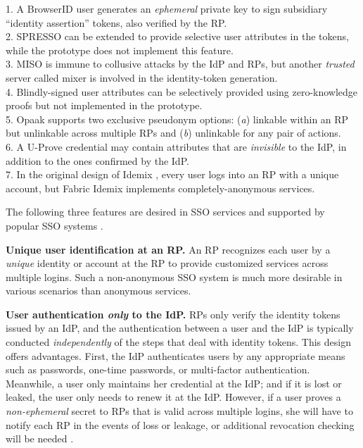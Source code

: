 \begin{table}[tb]
    \label{tbl:comparison-protocol}
\flushleft
{\footnotesize
1. A BrowserID user generates an \emph{ephemeral} private key to sign subsidiary ``identity assertion'' tokens,
also verified by the RP.\\
2. SPRESSO can be extended to provide selective user attributes in the tokens, while the prototype does not implement this feature.\\
3. MISO is immune to collusive attacks by the IdP and RPs, but another \emph{trusted} server called mixer is involved in the identity-token generation.\\
4. Blindly-signed user attributes can be selectively provided using zero-knowledge proofs but not implemented in the prototype.\\
5. Opaak supports two exclusive pseudonym options: (\emph{a}) linkable within an RP but unlinkable across multiple RPs and (\emph{b}) unlinkable for any pair of actions.\\
6. A U-Prove credential may contain attributes that are \emph{invisible} to the IdP, in addition to the ones confirmed by the IdP. \\
7. In the original design of Idemix \cite{idemix}, every user logs into an RP with a unique account, but Fabric Idemix implements completely-anonymous services.}
\end{table}

The following three features are desired in SSO services and supported by popular SSO systems \cite{NIST2017draft, OpenIDConnect,rfc6749, SAML, SAMLIdentifier}.

\noindent \textbf{Unique user identification at an RP.}
An RP recognizes each user by a \emph{unique} identity or account at the RP to provide customized services across multiple logins.
Such a non-anonymous SSO system is much more desirable in various scenarios than anonymous services.

\noindent\textbf{User authentication {\em only} to the IdP.}
RPs only verify the identity tokens issued by an IdP, and the authentication between a user and the IdP is typically conducted \emph{independently} of the steps that deal with identity tokens.
This design offers advantages. First, the IdP authenticates users by any appropriate means such as passwords, one-time passwords, or multi-factor authentication.
Meanwhile, a user only maintains her credential at the IdP; and if it is lost or leaked, the user only needs to renew it at the IdP.
However, if a user proves a \emph{non-ephemeral} secret to RPs that is valid across multiple logins, she will have to notify each RP in the events of loss or leakage, or additional revocation checking will be needed \cite{ELPASSO, UnlimitID}.

